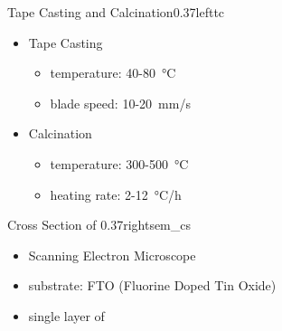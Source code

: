\documentclass[hyperref={pdfpagelabels=false}, aspectratio=43, t]{beamer}  %
\begin{document}
\begin{graphicsFrame}{Tape Casting and Calcination}{}{0.37}{left}{tc}{}

		\vspace{1em}
		\begin{itemize}
			\item Tape Casting
				\begin{itemize}
					\item temperature: 40-\SI{80}{\degreeCelsius}
					\item blade speed: 10-\SI{20}{\milli\meter/\second}
				\end{itemize}
				\vspace{1em}
			\item Calcination
				\begin{itemize}
					\item temperature: 300-\SI{500}{\degreeCelsius}
					\item heating rate: 2-\SI{12}{\degreeCelsius/\hour}
				\end{itemize}
		\end{itemize}
\end{graphicsFrame}

\begin{graphicsFrame}{Cross Section of }{}{0.37}{right}{sem_cs}{}
	\vspace{3em}
		\begin{itemize}
			\item Scanning Electron Microscope 
			\item substrate: FTO (Fluorine Doped Tin Oxide)
			\item single layer of 
		\end{itemize}
\end{graphicsFrame}
\end{document}
